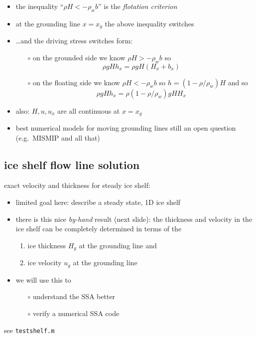 \documentclass[titlepage,letterpaper,final,11pt]{scrartcl}
\newcommand{\alert}[1]{\emph{#1}}
\begin{document}
\begin{itemize}
\item the inequality ``$\rho H < - \rho_w b$'' is the \alert{flotation criterion}
\item at the grounding line $x=x_g$ the above inequality switches
\item \dots and the driving stress switches form:
  \begin{itemize}
  \item[$\circ$] on the grounded side we know $\rho H > - \rho_w b$ so
  	$$\rho g H h_x = \rho g H (H_x + b_x)$$
  \item[$\circ$] on the floating side we know $\rho H < - \rho_w b$ so $h = (1-\rho/\rho_w) H$ and so
  	$$\rho g H h_x = \rho(1-\rho/\rho_w) g H H_x$$
  \end{itemize}
\item also: $H,u,u_x$ are all continuous at $x=x_g$
\item best numerical models for moving grounding lines still an open question (e.g.~MISMIP and all that)
\end{itemize}


\subsection{ice shelf flow line solution}

exact velocity and thickness for steady ice shelf:
\begin{itemize}
\item limited goal here: describe a steady state, 1D ice shelf
\item there is this nice \alert{by-hand} result (next slide): the thickness and velocity in the ice shelf can be completely determined \cite{MacAyealBarcilon,vanderVeen83} in terms of the 
  \begin{enumerate}
  \item ice thickness $H_g$ at the grounding line and
  \item ice velocity $u_g$ at the grounding line
  \end{enumerate}
\item we will use this to
  \begin{itemize}
  \item[$\circ$] understand the SSA better
  \item[$\circ$] verify a numerical SSA code
  \end{itemize}
\end{itemize}

see \texttt{testshelf.m} 
\end{document}
